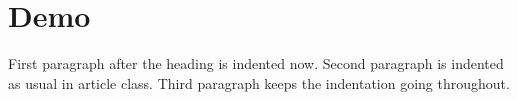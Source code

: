 \documentclass{article}
\begin{document}
\section{Demo}
First paragraph after the heading is indented now.
Second paragraph is indented as usual in article class.
Third paragraph keeps the indentation going throughout.
\end{document}
